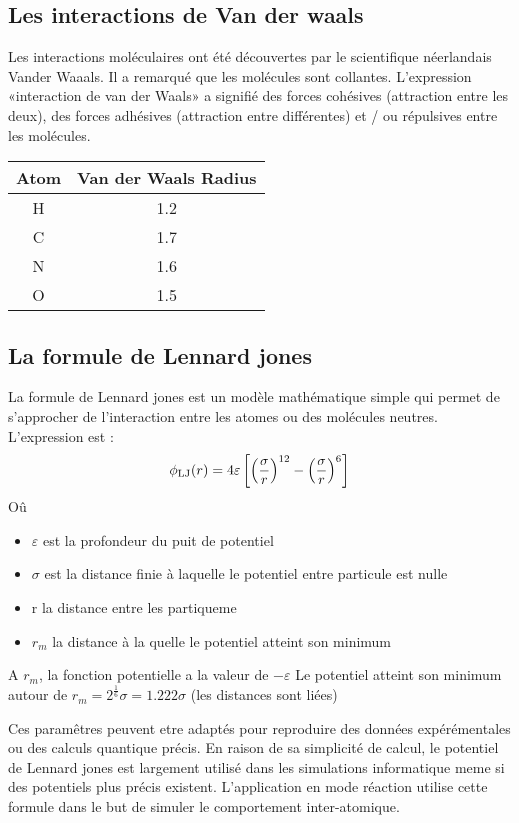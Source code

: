 \subsection{Les interactions de Van der waals}
Les interactions moléculaires ont été découvertes par le scientifique néerlandais Vander Waaals. Il a remarqué que les molécules sont collantes.
L'expression «interaction de van der Waals» a signifié des forces cohésives (attraction entre les deux), des forces adhésives (attraction entre différentes) et / ou répulsives entre les molécules.

\begin{table}[h!]
\centering
 \begin{tabular}{||c | c||}
 \hline
 Atom & Van der Waals Radius \\ [0.5ex]
 \hline\hline
 H & 1.2 \\
 \hline
 C & 1.7 \\
 \hline
 N & 1.6 \\
 \hline
 O & 1.5 \\
 \hline
 \end{tabular}
\end{table}
\subsection{La formule de Lennard jones }
La formule de Lennard jones est un modèle mathématique simple qui permet de s'approcher de l'interaction entre les atomes ou des molécules neutres.
L'expression est :
 \begin{displaymath} \phi_{\rm LJ} (r) = 4\varepsilon \left[ \left(\frac{\sigma}{r}\right)^{12} - \left(\frac{\sigma}{r}\right)^{6} \right]\end{displaymath}
Oû
\begin{itemize}
    \item $\varepsilon$ est la profondeur du puit de potentiel
    \item $\sigma$ est la distance finie à laquelle le potentiel entre particule est nulle
    \item r la distance entre les partiqueme
    \item $r_m$ la distance à la quelle le potentiel atteint son minimum
\end{itemize}

A $r_m$, la fonction potentielle a la valeur de $-\varepsilon$
Le potentiel atteint son minimum autour de $r_m = 2^{\frac{1}{6}} \sigma = 1.222 \sigma$ (les distances sont liées)

Ces paramêtres peuvent etre adaptés pour reproduire  des données expérémentales ou des calculs quantique précis.
En raison de sa simplicité de calcul, le potentiel de Lennard jones est largement utilisé dans les simulations informatique meme si des potentiels plus précis existent.
L'application en mode réaction utilise cette formule dans le but de simuler le comportement inter-atomique.

